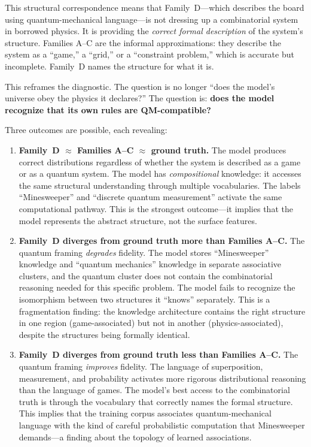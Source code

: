 \documentclass[12pt,a4paper]{article}
\begin{document}
\medskip

This structural correspondence means that Family~D---which describes the board using quantum-mechanical language---is not dressing up a combinatorial system in borrowed physics. It is providing the \emph{correct formal description} of the system's structure. Families A--C are the informal approximations: they describe the system as a ``game,'' a ``grid,'' or a ``constraint problem,'' which is accurate but incomplete. Family~D names the structure for what it is.

This reframes the diagnostic. The question is no longer ``does the model's universe obey the physics it declares?'' The question is: \textbf{does the model recognize that its own rules are QM-compatible?}

Three outcomes are possible, each revealing:

\begin{enumerate}[nosep]
    \item \textbf{Family~D $\approx$ Families A--C $\approx$ ground truth.} The model produces correct distributions regardless of whether the system is described as a game or as a quantum system. The model has \emph{compositional} knowledge: it accesses the same structural understanding through multiple vocabularies. The labels ``Minesweeper'' and ``discrete quantum measurement'' activate the same computational pathway. This is the strongest outcome---it implies that the model represents the abstract structure, not the surface features.
    \item \textbf{Family~D diverges from ground truth more than Families A--C.} The quantum framing \emph{degrades} fidelity. The model stores ``Minesweeper'' knowledge and ``quantum mechanics'' knowledge in separate associative clusters, and the quantum cluster does not contain the combinatorial reasoning needed for this specific problem. The model fails to recognize the isomorphism between two structures it ``knows'' separately. This is a fragmentation finding: the knowledge architecture contains the right structure in one region (game-associated) but not in another (physics-associated), despite the structures being formally identical.
    \item \textbf{Family~D diverges from ground truth less than Families A--C.} The quantum framing \emph{improves} fidelity. The language of superposition, measurement, and probability activates more rigorous distributional reasoning than the language of games. The model's best access to the combinatorial truth is through the vocabulary that correctly names the formal structure. This implies that the training corpus associates quantum-mechanical language with the kind of careful probabilistic computation that Minesweeper demands---a finding about the topology of learned associations.
\end{enumerate}
\end{document}
